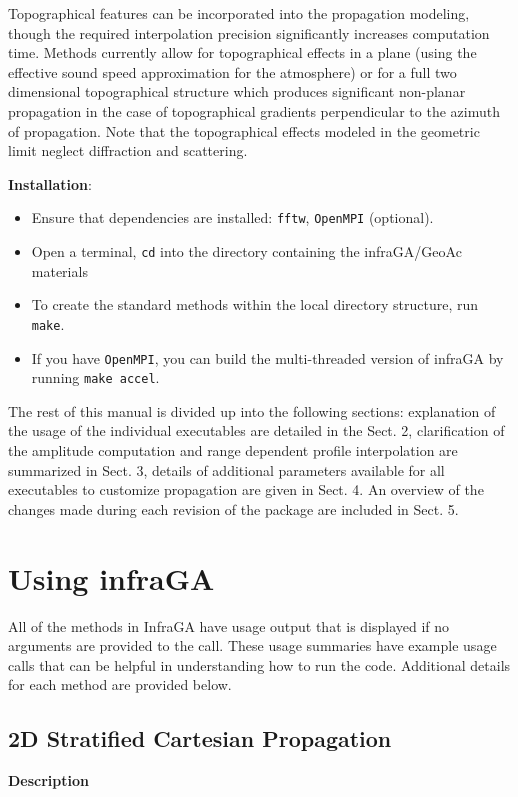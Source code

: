 \documentclass[10pt]{article}
\begin{document}
Topographical features can be incorporated into the propagation modeling, though the required interpolation precision significantly increases computation time.  Methods currently allow for topographical effects in a plane (using the effective sound speed approximation for the atmosphere) or for a full two dimensional topographical structure which produces significant non-planar propagation in the case of topographical gradients perpendicular to the azimuth of propagation.  Note that the topographical effects modeled in the geometric limit neglect diffraction and scattering.

\vspace*{10pt} 

\hspace{-0.25in}\textbf{Installation}:
 \begin{itemize}
   \item Ensure that dependencies are installed: \verb=fftw=, \verb=OpenMPI= (optional).
   \item Open a terminal, \verb=cd= into the directory containing the infraGA/GeoAc materials
   \item To create the standard methods within the local directory structure, run \verb=make=.
   \item If you have \verb=OpenMPI=, you can build the multi-threaded version of infraGA by running \verb=make accel=.
 \end{itemize}

The rest of this manual is divided up into the following sections:  explanation of the usage of the individual executables are detailed in the Sect. 2, clarification of the amplitude computation and range dependent profile interpolation are summarized in Sect. 3, details of additional parameters available for all executables to customize propagation are given in Sect. 4.  An overview of the changes made during each revision of the package are included in Sect. 5.

\newpage
\section{Using infraGA}
\label{Sect:Usage}

All of the methods in InfraGA have usage output that is displayed if no arguments are provided to the call.  These usage summaries have example usage calls that can be helpful in understanding how to run the code.  Additional details for each method are provided below.

\subsection{2D Stratified Cartesian Propagation}
\label{Sect:Usage:2D}
\textbf{Description}  
\end{document}
